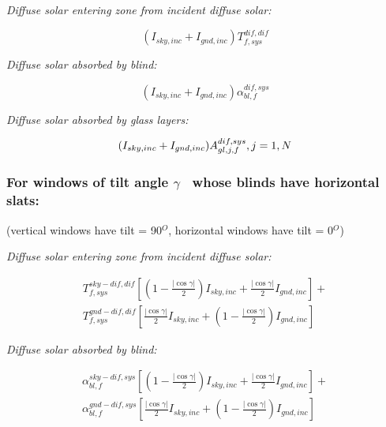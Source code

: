 \emph{Diffuse solar entering zone from incident diffuse solar:}

\begin{equation}
({I_{sky,inc}} + {I_{gnd,inc}})T_{f,sys}^{dif,dif}
\end{equation}

\emph{Diffuse solar absorbed by blind:}

\begin{equation}
({I_{sky,inc}} + {I_{gnd,inc}})\alpha_{bl,f}^{dif,sys}
\end{equation}

\emph{Diffuse solar absorbed by glass layers:}

\begin{equation}
({I_{sky,inc}} + {I_{gnd,inc}})A_{gl,j,f}^{dif,sys},{\rm{   }}j = 1,N{\rm{ }}
\end{equation}

\subsubsection{\texorpdfstring{For windows of tilt angle \(\gamma\) ~whose blinds have horizontal slats:}{For windows of tilt angle \textbackslash{}gamma ~whose blinds have horizontal slats:}}\label{for-windows-of-tilt-angle-gamma-whose-blinds-have-horizontal-slats}

(vertical windows have tilt = 90\(^{O}\), horizontal windows have tilt = 0\(^{O}\))

\emph{Diffuse solar entering zone from incident diffuse solar:}

\begin{equation}
\begin{split}
T_{f,sys}^{sky - dif,dif}\left[ {\left( {1 - \frac{{|\cos \gamma |}}{2}} \right){I_{sky,inc}} + \frac{{|\cos \gamma |}}{2}{I_{gnd,inc}}} \right] + \\
T_{f,sys}^{gnd - dif,dif}\left[ {\frac{{|\cos \gamma |}}{2}{I_{sky,inc}} + \left( {1 - \frac{{|\cos \gamma |}}{2}} \right){I_{gnd,inc}}} \right]
\end{split}
\end{equation}

\emph{Diffuse solar absorbed by blind:}

\begin{equation}
\begin{split}
\alpha_{bl,f}^{sky - dif,sys}\left[ {\left( {1 - \frac{{|\cos \gamma |}}{2}} \right){I_{sky,inc}} + \frac{{|\cos \gamma |}}{2}{I_{gnd,inc}}} \right] + \\
\alpha_{bl,f}^{gnd - dif,sys}\left[ {\frac{{|\cos \gamma |}}{2}{I_{sky,inc}} + \left( {1 - \frac{{|\cos \gamma |}}{2}} \right){I_{gnd,inc}}} \right]
\end{split}
\end{equation}

